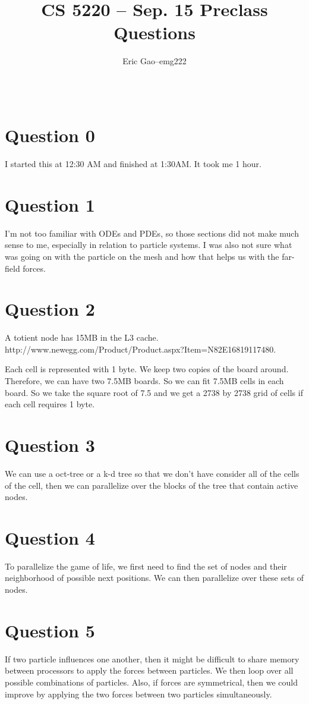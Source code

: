 \documentclass[11pt]{article}
\title{CS 5220 -- Sep. 15 Preclass Questions} %
\author{
  \begin{tabular}{l c l}
    Eric Gao & -- & emg222\\
  \end{tabular}\\
  \rule{\linewidth}{0.4pt}
}
\date{}
\begin{document}
    \thispagestyle{empty}
    \maketitle

    \section*{Question 0}
        I started this at 12:30 AM and finished at 1:30AM. It took me 1 hour.

    \section*{Question 1}
        I'm not too familiar with ODEs and PDEs, so those sections did not make much sense to me, especially in relation to particle systems. I was also not sure what was going on with the particle on the mesh and how that helps us with the far-field forces.

    \section*{Question 2}
        A totient node has 15MB in the L3 cache. \\
        http://www.newegg.com/Product/Product.aspx?Item=N82E16819117480.

        Each cell is represented with 1 byte. We keep two copies of the board around. Therefore, we can have two 7.5MB boards. So we can fit 7.5MB cells in each board. So we take the square root of 7.5 and we get a 2738 by 2738 grid of cells if each cell requires 1 byte.

    \section*{Question 3}
        We can use a oct-tree or a k-d tree so that we don't have consider all of the cells of the cell, then we can parallelize over the blocks of the tree that contain active nodes.

    \section*{Question 4}
        To parallelize the game of life, we first need to find the set of nodes and their neighborhood of possible next positions. We can then parallelize over these sets of nodes.

    \section*{Question 5}
        If two particle influences one another, then it might be difficult to share memory between processors to apply the forces between particles. We then loop over all possible combinations of particles. Also, if forces are symmetrical, then we could improve by applying the two forces between two particles simultaneously.
\end{document}
